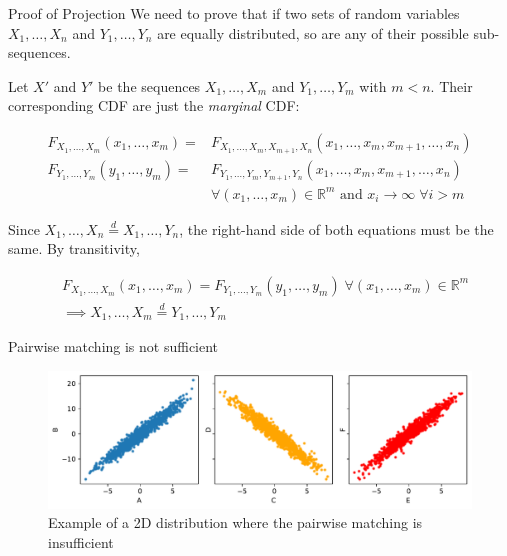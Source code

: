 \documentclass[10pt,compress]{beamer}
\newcommand{\eqdist}{\stackrel{d}{=}}
\begin{document}
\begin{frame}{Proof of Projection}
\small
We need to prove that if two sets of random variables
$X_1,\dots,X_n$ and $Y_1,\dots,Y_n$ are equally distributed, so are
any of their possible sub-sequences.

Let $X'$ and $Y'$ be the sequences $X_1,\dots,X_m$ and $Y_1,\dots,Y_m$ with $m < n$.
Their corresponding  CDF are just the \emph{marginal} CDF:

\begin{equation}
\begin{split}
    F_{X_1,\dots,X_m}(x_1,\dots,x_m) = & F_{X_1,\dots,X_m,X_{m+1},X_n}(x_1,\dots,x_m,x_{m+1},\dots,x_n) \\
    F_{Y_1,\dots,Y_m}(y_1,\dots,y_m) =& F_{Y_1,\dots,Y_m,Y_{m+1},Y_n}(x_1,\dots,x_m,x_{m+1},\dots,x_n)\\
    & \forall (x_1,\dots,x_m) \in \mathbb{R}^m \textrm{ and } x_i \xrightarrow{} \infty \; \forall i > m
\end{split}
\end{equation}

Since $X_1,\ldots,X_n \eqdist X_1,\ldots,Y_n$, the right-hand side of both equations must be the same.
By transitivity, 

\begin{equation}
\begin{split}
    & F_{X_1,\dots,X_m}(x_1,\dots,x_m) = F_{Y_1,\dots,Y_m}(y_1,\dots,y_m) \; \forall (x_1,\dots,x_m) \in \mathbb{R}^m \\
    & \implies X_1,\dots,X_m \eqdist Y_1,\dots,Y_m
\end{split}
\end{equation}


\end{frame}

\begin{frame}{Pairwise matching is not sufficient}
\begin{figure}
    \centering
    \includegraphics[width=\textwidth]{no2ind.pdf}
    \caption{Example of a 2D distribution where the pairwise matching is insufficient}
\end{figure}
\end{frame}
\end{document}
